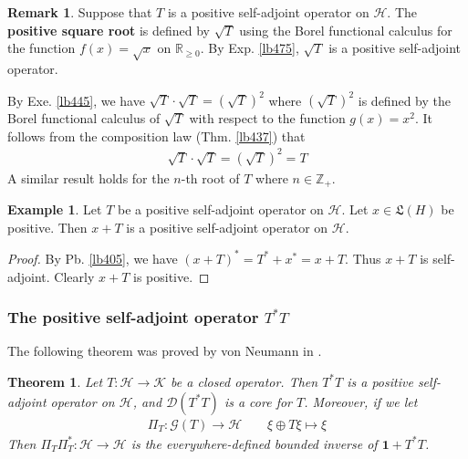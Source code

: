 \documentclass[12pt,b5paper,notitlepage]{article}
\theoremstyle{definition}
\newtheorem{eg}[df]{Example}
\newtheorem{rem}[df]{Remark}
\theoremstyle{plain}
\newtheorem{thm}[df]{Theorem}
\newcommand{\fk}{\mathfrak}
\newcommand{\idt}{\mathbf{1}}
\newcommand{\Dom}{\mathscr{D}}
\newcommand{\Zbb}{\mathbb Z}
\newcommand{\Rbb}{\mathbb R}
\newcommand{\MH}{\mathcal H}
\newcommand{\MK}{\mathcal K}
\newcommand{\SG}{\mathscr G}
\newcommand{\hqed}{\hfill\qedsymbol}
\numberwithin{equation}{section}
\begin{document}
\begin{rem}\label{lb467}
Suppose that $T$ is a positive self-adjoint operator on $\MH$. The \textbf{positive square root}  is defined by $\sqrt T$ using the Borel functional calculus for the function $f(x)=\sqrt x$ on $\Rbb_{\geq0}$. By Exp. \ref{lb475}, $\sqrt T$ is a positive self-adjoint operator. 

By Exe. \ref{lb445}, we have $\sqrt T\cdot \sqrt T=(\sqrt T)^2$ where $(\sqrt T)^2$ is defined by the Borel functional calculus of $\sqrt T$ with respect to the function $g(x)=x^2$. It follows from the composition law (Thm. \ref{lb437}) that
\begin{align*}
\sqrt T\cdot \sqrt T=(\sqrt T)^2=T
\end{align*}
A similar result holds for the $n$-th root of $T$ where $n\in\Zbb_+$.  \hqed
\end{rem}


\begin{eg}\label{lb477}
Let $T$ be a positive self-adjoint operator on $\MH$. Let $x\in\fk L(H)$ be positive. Then $x+T$ is a positive self-adjoint operator on $\MH$. 
\end{eg}


\begin{proof}
By Pb. \ref{lb405}, we have $(x+T)^*=T^*+x^*=x+T$. Thus $x+T$ is self-adjoint. Clearly $x+T$ is positive.
\end{proof}




\subsubsection{The positive self-adjoint operator $T^*T$}





The following theorem was proved by von Neumann in \cite{vN32b}.

\begin{thm}\label{lb458}
Let $T:\MH\rightarrow\MK$ be a closed operator. Then $T^*T$ is a positive self-adjoint operator on $\MH$, and $\Dom(T^*T)$ is a core for $T$. Moreover, if we let \index{zz@$\Pi_T:\SG(T)\rightarrow\MH$}
\begin{align}
\Pi_T:\SG(T)\rightarrow\MH\qquad \xi\oplus T\xi\mapsto \xi
\end{align}
Then $\Pi_T\Pi^*_T:\MH\rightarrow\MH$ is the everywhere-defined bounded inverse of $\idt+T^*T$.
\end{thm}
\end{document}

